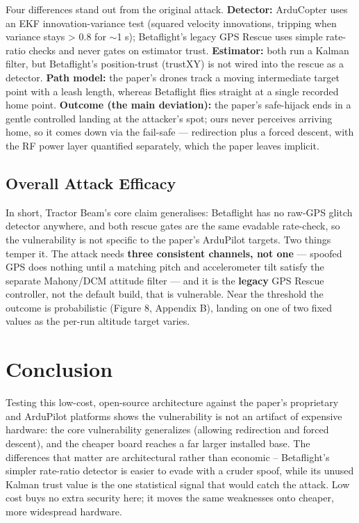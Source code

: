 \documentclass[11pt]{article}
\begin{document}
Four differences stand out from the original attack. \textbf{Detector:} ArduCopter uses an EKF innovation-variance test (squared velocity innovations, tripping when variance stays > 0.8 for $\sim$1 s); Betaflight's legacy GPS Rescue uses simple rate-ratio checks and never gates on estimator trust. \textbf{Estimator:} both run a Kalman filter, but Betaflight's position-trust (trustXY) is not wired into the rescue as a detector. \textbf{Path model:} the paper's drones track a moving intermediate target point with a leash length, whereas Betaflight flies straight at a single recorded home point. \textbf{Outcome (the main deviation):} the paper's safe-hijack ends in a gentle controlled landing at the attacker's spot; ours never perceives arriving home, so it comes down via the fail-safe — redirection plus a forced descent, with the RF power layer quantified separately, which the paper leaves implicit.

\subsection*{Overall Attack Efficacy}
In short, Tractor Beam's core claim generalises: Betaflight has no raw-GPS glitch detector anywhere, and both rescue gates are the same evadable rate-check, so the vulnerability is not specific to the paper's ArduPilot targets. Two things temper it. The attack needs \textbf{three consistent channels, not one} — spoofed GPS does nothing until a matching pitch and accelerometer tilt satisfy the separate Mahony/DCM attitude filter — and it is the \textbf{legacy} GPS Rescue controller, not the default build, that is vulnerable. Near the threshold the outcome is probabilistic (Figure 8, Appendix B), landing on one of two fixed values as the per-run altitude target varies.

\section*{Conclusion}
Testing this low-cost, open-source architecture against the paper's proprietary and ArduPilot platforms shows the vulnerability is not an artifact of expensive hardware: the core vulnerability generalizes (allowing redirection and forced descent), and the cheaper board reaches a far larger installed base. The differences that matter are architectural rather than economic – Betaflight's simpler rate-ratio detector is easier to evade with a cruder spoof, while its unused Kalman trust value is the one statistical signal that would catch the attack. Low cost buys no extra security here; it moves the same weaknesses onto cheaper, more widespread hardware.
\end{document}
